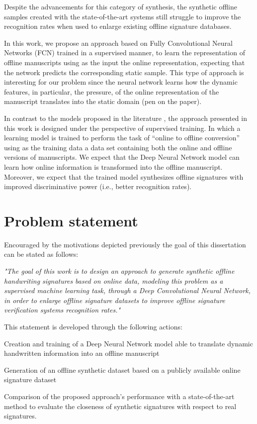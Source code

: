 Despite the advancements for this category of synthesis, the synthetic offline samples created with the state-of-the-art systems still struggle to improve the recognition rates when used to enlarge existing offline signature databases.


In this work, we propose an approach based on Fully Convolutional Neural Networks (FCN) trained in a supervised manner, to learn the representation of offline manuscripts using as the input the online representation, expecting that the network predicts the corresponding static sample. This type of approach is interesting for our problem since the neural network learns how the dynamic features, in particular, the pressure, of the online representation of the manuscript translates into the static domain (pen on the paper). 

In contrast to the models proposed in the literature \cite{ferrer2013synthetic, ferrer2013realistic, diaz2014generation}, the approach presented in this work is designed under the perspective of supervised training. In which a learning model is trained to perform the task of ``online to offline conversion'' using as the training data a data set containing both the online and offline versions of manuscripts. We expect that the Deep Neural Network model can learn how online information is transformed into the offline manuscript. Moreover, we expect that the trained model synthesizes offline signatures with improved discriminative power (i.e., better recognition rates). 

\section{Problem statement}
Encouraged by the motivations depicted previously the goal of this dissertation can be stated as follows:

\textit{"The goal of this work is to design an approach to generate synthetic offline handwriting signatures based on online data, modeling this problem as a supervised machine learning task, through a Deep Convolutional Neural Network, in order to enlarge offline signature datasets to improve offline signature verification systems recognition rates."}

This statement is developed through the following actions:
\begin{inlinelist}
\item Creation and training of a Deep Neural Network model able to translate dynamic handwritten information into an offline manuscript
\item Generation of an offline synthetic dataset based on a publicly available online signature dataset
\item Comparison of the proposed approach’s performance with a state-of-the-art method to evaluate the closeness of synthetic signatures with respect to real signatures. 
\end{inlinelist}

